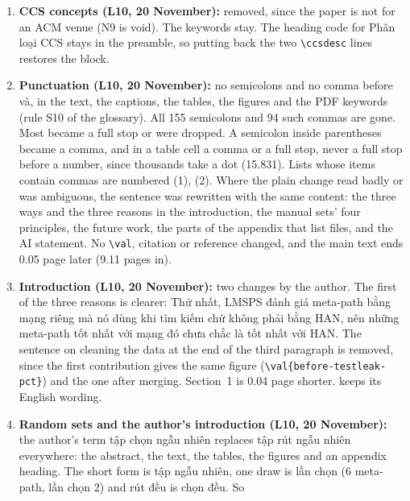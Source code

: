 \documentclass[11pt,a4paper]{article}
\DeclareRobustCommand{\code}[1]{\texttt{\detokenize{#1}}}
\newcommand{\vi}[1]{\foreignlanguage{vietnamese}{#1}}
\begin{document}
\begin{enumerate}[label=N\arabic*]
        merging duplicate editions (with \verb|\val{before-testleak-pct}|) and the sentence on GAT beating
        both meta-path models, which the English abstract keeps. The searched sets are \vi{tổng hợp từ
        30 lần chạy}, and the last sentence reads \vi{chưa cho thấy hiệu quả vượt trội}.
  \item \textbf{CCS concepts (L10, 20 November):} removed, since the paper is not for an ACM venue
        (N9 is void). The keywords stay. The heading code for \vi{Phân loại CCS} stays in the
        preamble, so putting back the two \verb|\ccsdesc| lines restores the block.
  \item \textbf{Punctuation (L10, 20 November):} no semicolons and no comma before \vi{và}, in the
        text, the captions, the tables, the figures and the PDF keywords (rule S10 of the glossary).
        All 155 semicolons and 94 such commas are gone. Most became a full stop or were dropped. A
        semicolon inside parentheses became a comma, and in a table cell a comma or a full stop,
        never a full stop before a number, since thousands take a dot (15.831). Lists whose items
        contain commas are numbered (1), (2). Where the plain change read badly or was ambiguous,
        the sentence was rewritten with the same content: the three ways and the three reasons in
        the introduction, the manual sets' four principles, the future work, the parts of the
        appendix that list files, and the AI statement. No \verb|\val|, citation or reference
        changed, and the main text ends 0.05 page later (9.11 pages in).
  \item \textbf{Introduction (L10, 20 November):} two changes by the author. The first of the three
        reasons is clearer: \vi{Thứ nhất, LMSPS đánh giá meta-path bằng mạng riêng mà nó dùng khi
        tìm kiếm chứ không phải bằng HAN, nên những meta-path tốt nhất với mạng đó chưa chắc là tốt
        nhất với HAN.} The sentence on cleaning the data at the end of the third paragraph is
        removed, since the first contribution gives the same figure (\verb|\val{before-testleak-pct}|)
        and the one after merging. Section~1 is 0.04 page shorter. \code{paper_v2} keeps its
        English wording.
  \item \textbf{Random sets and the author's introduction (L10, 20 November):} the author's term
        \vi{tập chọn ngẫu nhiên} replaces \vi{tập rút ngẫu nhiên} everywhere: the abstract, the text,
        the tables, the figures and an appendix heading. The short form is \vi{tập ngẫu nhiên}, one
        draw is \vi{lần chọn} (\vi{6 meta-path, lần chọn 2}) and \vi{rút đều} is \vi{chọn đều}. So

\end{enumerate}
\end{document}
